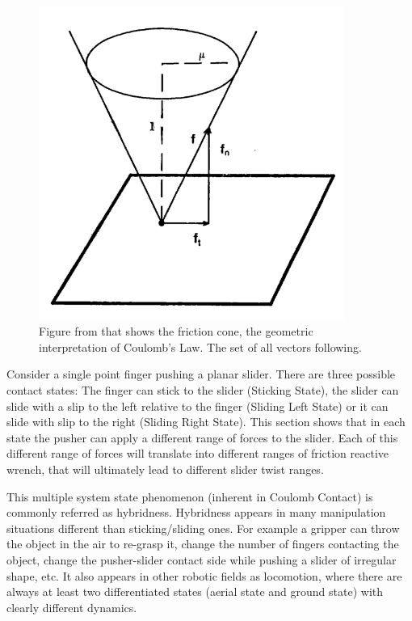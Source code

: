 \documentclass[12,twoside]{TFG-GM}
\theoremstyle{definition}
\theoremstyle{remark}
\begin{document}
\begin{figure}[htb!]
\begin{center}
\includegraphics[width=10cm]{friction_cone.png}
\end{center}
\caption[test caption]{\label{fig:book} \small{Figure from \protect\cite{pushing4} that shows the friction cone, the geometric interpretation of Coulomb's Law. The set of all vectors following.}}
\end{figure}

Consider a single point finger pushing a planar slider. There are three possible contact states: The finger can stick to the slider (Sticking State), the slider can slide with a slip to the left relative to the finger (Sliding Left State) or it can slide with slip to the right (Sliding Right State). This section shows that in each state the pusher can apply a different range of forces to the slider. Each of this different range of forces will translate into different ranges of friction reactive wrench, that will ultimately lead to different slider twist ranges.

This multiple system state phenomenon (inherent in Coulomb Contact) is commonly referred as hybridness. Hybridness appears in many manipulation situations different than sticking/sliding ones. For example a gripper can throw the object in the air to re-grasp it, change the number of fingers contacting the object, change the pusher-slider contact side while pushing a slider of irregular shape, etc. It also appears in other robotic fields as locomotion, where there are always at least two differentiated states (aerial state and ground state) with clearly different dynamics. 
\end{document}

